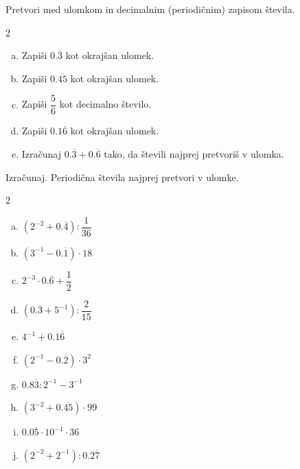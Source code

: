 \documentclass[a4paper,12pt]{letter}
\begin{document}
\begin{naloga}
Pretvori med ulomkom in decimalnim (periodi\v{c}nim) zapisom \v{s}tevila.

\begin{multicols}{2}
\begin{enumerate}[a.)]
\item Zapi\v{s}i $0.\overline{3}$ kot okraj\v{s}an ulomek.
\item Zapi\v{s}i $0.\overline{45}$ kot okraj\v{s}an ulomek.
\item Zapi\v{s}i $\dfrac{5}{6}$ kot decimalno \v{s}tevilo.
\item Zapi\v{s}i $0.1\overline{6}$ kot okraj\v{s}an ulomek.
\item Izra\v{c}unaj $0.\overline{3}+0.\overline{6}$ tako, da \v{s}tevili najprej pretvori\v{s} v ulomka.
\end{enumerate}
\end{multicols}
\end{naloga}

\begin{naloga}
Izra\v{c}unaj. Periodi\v{c}na \v{s}tevila najprej pretvori v ulomke.

\begin{multicols}{2}
\begin{enumerate}[a.)]
\item $\left(2^{-2}+0.\overline{4}\right):\dfrac{1}{36}$
\item $\left(3^{-1}-0.\overline{1}\right)\cdot18$
\item $2^{-3}\cdot0.\overline{6}+\dfrac{1}{2}$
\item $\left(0.\overline{3}+5^{-1}\right):\dfrac{2}{15}$
\item $4^{-1}+0.1\overline{6}$
\item $\left(2^{-1}-0.\overline{2}\right)\cdot3^2$
\item $0.8\overline{3}:2^{-1}-3^{-1}$
\item $\left(3^{-2}+0.\overline{45}\right)\cdot99$
\item $0.0\overline{5}\cdot10^{-1}\cdot36$
\item $\left(2^{-2}+2^{-1}\right):0.2\overline{7}$
\end{enumerate}
\end{multicols}
\end{naloga}
\end{document}
